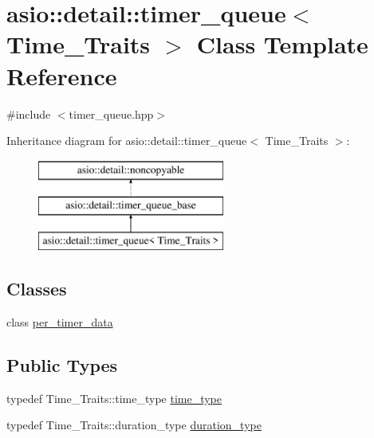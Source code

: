 \hypertarget{classasio_1_1detail_1_1timer__queue}{}\section{asio\+:\+:detail\+:\+:timer\+\_\+queue$<$ Time\+\_\+\+Traits $>$ Class Template Reference}
\label{classasio_1_1detail_1_1timer__queue}


{\ttfamily \#include $<$timer\+\_\+queue.\+hpp$>$}

Inheritance diagram for asio\+:\+:detail\+:\+:timer\+\_\+queue$<$ Time\+\_\+\+Traits $>$\+:\begin{figure}[H]
\begin{center}
\leavevmode
\includegraphics[height=3.000000cm]{classasio_1_1detail_1_1timer__queue}
\end{center}
\end{figure}
\subsection*{Classes}
\begin{DoxyCompactItemize}
\item 
class \hyperlink{classasio_1_1detail_1_1timer__queue_1_1per__timer__data}{per\+\_\+timer\+\_\+data}
\end{DoxyCompactItemize}
\subsection*{Public Types}
\begin{DoxyCompactItemize}
\item 
typedef Time\+\_\+\+Traits\+::time\+\_\+type \hyperlink{classasio_1_1detail_1_1timer__queue_aed8a9658d61debbeb8d201f4dc74e139}{time\+\_\+type}
\item 
typedef Time\+\_\+\+Traits\+::duration\+\_\+type \hyperlink{classasio_1_1detail_1_1timer__queue_af8b576763396e5af620c640e253f4f54}{duration\+\_\+type}
\end{DoxyCompactItemize}
